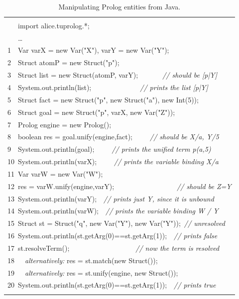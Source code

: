 \begin{table}[h]
    \small
    \begin{center}{\tt
    \begin{tabular}{p{13cm}}\hline\\
    \mbox{~~~}import alice.tuprolog.*;\\
    \mbox{~~~}\ldots\\
    \mbox{1~~}Var varX = new Var("X"), varY = new Var("Y"); \\
    \mbox{2~~}Struct atomP = new Struct("p");\\
    \mbox{3~~}Struct list = new Struct(atomP, varY);~~~~~~~\textit{// should be [p|Y]}\\
    \mbox{4~~}System.out.println(list);~~~~~~~~~~~~~~\textit{// prints the list [p|Y]}\\
    \mbox{5~~}Struct fact = new Struct("p", new Struct("a"), new Int(5));\\
    \mbox{6~~}Struct goal = new Struct("p", varX, new Var("Z"));\\
    \mbox{7~~}Prolog engine = new Prolog();\\
    \mbox{8~~}boolean res = goal.unify(engine,fact);~~~~~\textit{// should be X/a, Y/5}\\
    \mbox{9~~}System.out.println(goal);~~~~~\textit{// prints the unified term p(a,5)}\\
    \mbox{10~}System.out.println(varX);~~~~~\textit{// prints the variable binding X/a}\\
    \mbox{11~}Var varW = new Var("W");\\
    \mbox{12~}res = varW.unify(engine,varY);~~~~~~~~~~~~~~~~~~\textit{// should be Z=Y}\\
    \mbox{13~}System.out.println(varY);~~\textit{// prints just Y, since it is unbound}\\
    \mbox{14~}System.out.println(varW);~~\textit{// prints the variable binding W / Y}\\
    \mbox{15~}Struct st = Struct("q", new Var("Y"), new Var("Y"));~\textit{// unresolved}\\
    \mbox{16~}System.out.println(st.getArg(0)==st.getArg(1));~~\textit{// prints false}\\
    \mbox{17~}st.resolveTerm();~~~~~~~~~~~~~~~~~~~\textit{// now the term is resolved}\\
    \mbox{18~}~~\textit{alternatively:} res = st.match(new Struct());\\
    \mbox{19~}~~\textit{alternatively:} res = st.unify(engine, new Struct());\\
    \mbox{20~}System.out.println(st.getArg(0)==st.getArg(1));~~\textit{// prints true}\\
    \\\hline
    \end{tabular}}
    \end{center}
    \caption{Manipulating Prolog entities from Java.}
    \label{tab:creating-prolog-terms-in-java}
\end{table}

